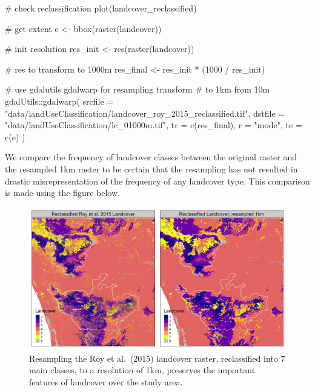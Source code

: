 \documentclass[
]{article}
\newenvironment{Shaded}{}{}
\newcommand{\CommentTok}[1]{\textcolor[rgb]{0.00,0.50,0.00}{#1}}
\newcommand{\DataTypeTok}[1]{#1}
\newcommand{\DecValTok}[1]{#1}
\newcommand{\KeywordTok}[1]{\textcolor[rgb]{0.00,0.00,1.00}{#1}}
\newcommand{\NormalTok}[1]{#1}
\newcommand{\OperatorTok}[1]{#1}
\newcommand{\StringTok}[1]{\textcolor[rgb]{0.00,0.50,0.50}{#1}}
\begin{document}
\begin{Shaded}
\begin{Highlighting}[]
\CommentTok{# check reclassification}
\KeywordTok{plot}\NormalTok{(landcover_reclassified)}

\CommentTok{# get extent}
\NormalTok{e <-}\StringTok{ }\KeywordTok{bbox}\NormalTok{(}\KeywordTok{raster}\NormalTok{(landcover))}

\CommentTok{# init resolution}
\NormalTok{res_init <-}\StringTok{ }\KeywordTok{res}\NormalTok{(}\KeywordTok{raster}\NormalTok{(landcover))}

\CommentTok{# res to transform to 1000m}
\NormalTok{res_final <-}\StringTok{ }\NormalTok{res_init }\OperatorTok{*}\StringTok{ }\NormalTok{(}\DecValTok{1000} \OperatorTok{/}\StringTok{ }\NormalTok{res_init)}

\CommentTok{# use gdalutils gdalwarp for resampling transform}
\CommentTok{# to 1km from 10m}
\NormalTok{gdalUtils}\OperatorTok{::}\KeywordTok{gdalwarp}\NormalTok{(}
  \DataTypeTok{srcfile =} \StringTok{"data/landUseClassification/landcover_roy_2015_reclassified.tif"}\NormalTok{,}
  \DataTypeTok{dstfile =} \StringTok{"data/landUseClassification/lc_01000m.tif"}\NormalTok{,}
  \DataTypeTok{tr =} \KeywordTok{c}\NormalTok{(res_final), }\DataTypeTok{r =} \StringTok{"mode"}\NormalTok{, }\DataTypeTok{te =} \KeywordTok{c}\NormalTok{(e)}
\NormalTok{)}
\end{Highlighting}
\end{Shaded}

We compare the frequency of landcover classes between the original raster and the resampled 1km raster to be certain that the resampling has not resulted in drastic misrepresentation of the frequency of any landcover type. This comparison is made using the figure below.

\begin{figure}
\centering
\includegraphics{figs/fig_landcover_resample.png}
\caption{Resampling the Roy et al.~(2015) landcover raster, reclassified into 7 main classes, to a resolution of 1km, preserves the important features of landcover over the study area.}
\end{figure}
\end{document}
